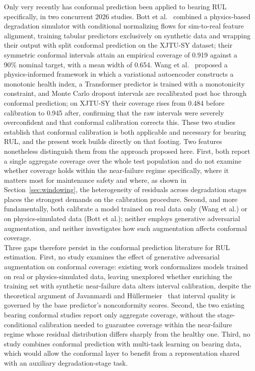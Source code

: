 Only very recently has conformal prediction been applied to bearing
RUL specifically, in two concurrent 2026 studies.
Bott et al.~\cite{11373138} combined a physics-based degradation
simulator with conditional normalizing flows for sim-to-real feature
alignment, training tabular predictors exclusively on synthetic data
and wrapping their output with split conformal prediction on the
XJTU-SY dataset; their symmetric conformal intervals attain an
empirical coverage of 0.919 against a 90\% nominal target, with a mean
width of 0.654.
Wang et al.~\cite{wang_uncertainty-aware_2026} proposed a
physics-informed framework in which a variational autoencoder
constructs a monotonic health index, a Transformer predictor is
trained with a monotonicity constraint, and Monte Carlo dropout
intervals are recalibrated post hoc through conformal prediction;
on XJTU-SY their coverage rises from 0.484 before calibration to 0.945
after, confirming that the raw intervals were severely overconfident
and that conformal calibration corrects this. These two studies
establish that conformal calibration is both applicable and necessary
for bearing RUL, and the present work builds directly on that footing.
Two features nonetheless distinguish them from the approach proposed
here. First, both report a single aggregate coverage over the whole
test population and do not examine whether coverage holds within the
near-failure regime specifically, where it matters most for maintenance
safety and where, as shown in Section~\ref{sec:windowing}, the
heterogeneity of residuals across degradation stages places the
strongest demands on the calibration procedure. Second, and more
fundamentally, both calibrate a model trained on real data only (Wang
et al.) or on physics-simulated data (Bott et al.); neither employs
generative adversarial augmentation, and neither investigates how such
augmentation affects conformal coverage.\\

Three gaps therefore persist in the conformal prediction literature for
RUL estimation. First, no study examines the effect of generative
adversarial augmentation on conformal coverage: existing work
conformalizes models trained on real or physics-simulated data, leaving
unexplored whether enriching the training set with synthetic
near-failure data alters interval calibration, despite the theoretical
argument of Javanmardi and
H{\"u}llermeier~\cite{javanmardi_conformal_2023} that interval quality
is governed by the base predictor's nonconformity scores. Second, the
two existing bearing conformal studies report only aggregate coverage,
without the stage-conditional calibration needed to guarantee coverage
within the near-failure regime whose residual distribution differs
sharply from the healthy one. Third, no study combines conformal
prediction with multi-task learning on bearing data, which would allow
the conformal layer to benefit from a representation shared with an
auxiliary degradation-stage task.


